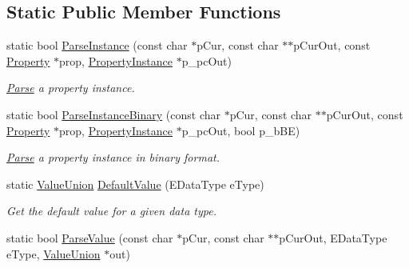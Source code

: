 \subsection*{Static Public Member Functions}
\begin{DoxyCompactItemize}
\item 
\hypertarget{class_assimp_1_1_p_l_y_1_1_property_instance_a33176438708b7b2daa868f6b6aa638d8}{static bool \hyperlink{class_assimp_1_1_p_l_y_1_1_property_instance_a33176438708b7b2daa868f6b6aa638d8}{Parse\+Instance} (const char $\ast$p\+Cur, const char $\ast$$\ast$p\+Cur\+Out, const \hyperlink{class_assimp_1_1_p_l_y_1_1_property}{Property} $\ast$prop, \hyperlink{class_assimp_1_1_p_l_y_1_1_property_instance}{Property\+Instance} $\ast$p\+\_\+pc\+Out)}\label{class_assimp_1_1_p_l_y_1_1_property_instance_a33176438708b7b2daa868f6b6aa638d8}

\begin{DoxyCompactList}\small\item\em \hyperlink{struct_parse}{Parse} a property instance. \end{DoxyCompactList}\item 
\hypertarget{class_assimp_1_1_p_l_y_1_1_property_instance_a298562245bfac53f75ec5064dadf1790}{static bool \hyperlink{class_assimp_1_1_p_l_y_1_1_property_instance_a298562245bfac53f75ec5064dadf1790}{Parse\+Instance\+Binary} (const char $\ast$p\+Cur, const char $\ast$$\ast$p\+Cur\+Out, const \hyperlink{class_assimp_1_1_p_l_y_1_1_property}{Property} $\ast$prop, \hyperlink{class_assimp_1_1_p_l_y_1_1_property_instance}{Property\+Instance} $\ast$p\+\_\+pc\+Out, bool p\+\_\+b\+B\+E)}\label{class_assimp_1_1_p_l_y_1_1_property_instance_a298562245bfac53f75ec5064dadf1790}

\begin{DoxyCompactList}\small\item\em \hyperlink{struct_parse}{Parse} a property instance in binary format. \end{DoxyCompactList}\item 
\hypertarget{class_assimp_1_1_p_l_y_1_1_property_instance_a06ac465347277e141e616a5bfd3de694}{static \hyperlink{union_assimp_1_1_p_l_y_1_1_property_instance_1_1_value_union}{Value\+Union} \hyperlink{class_assimp_1_1_p_l_y_1_1_property_instance_a06ac465347277e141e616a5bfd3de694}{Default\+Value} (E\+Data\+Type e\+Type)}\label{class_assimp_1_1_p_l_y_1_1_property_instance_a06ac465347277e141e616a5bfd3de694}

\begin{DoxyCompactList}\small\item\em Get the default value for a given data type. \end{DoxyCompactList}\item 
\hypertarget{class_assimp_1_1_p_l_y_1_1_property_instance_a4c7105348cf6574bd1ee74dc01e99229}{static bool \hyperlink{class_assimp_1_1_p_l_y_1_1_property_instance_a4c7105348cf6574bd1ee74dc01e99229}{Parse\+Value} (const char $\ast$p\+Cur, const char $\ast$$\ast$p\+Cur\+Out, E\+Data\+Type e\+Type, \hyperlink{union_assimp_1_1_p_l_y_1_1_property_instance_1_1_value_union}{Value\+Union} $\ast$out)}\label{class_assimp_1_1_p_l_y_1_1_property_instance_a4c7105348cf6574bd1ee74dc01e99229}


\end{DoxyCompactItemize}
